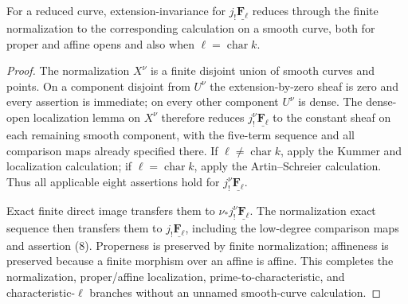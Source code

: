 \begin{lemma}
\label{lemma:weil-pbc-curve-normalization-constant}
\uses{}

For a reduced curve, extension-invariance for $j_!\underline{\mathbf F_\ell}$
reduces through the finite normalization to the corresponding calculation on
a smooth curve, both for proper and affine opens and also when
$\ell=\operatorname{char}k$.
\end{lemma}
\begin{proof}

The normalization $X^\nu$ is a finite disjoint union of smooth curves and
points.  On a component disjoint from $U^\nu$ the extension-by-zero sheaf is
zero and every assertion is immediate; on every other component $U^\nu$ is
dense.  The dense-open localization lemma on $X^\nu$ therefore reduces
$j^\nu_!\underline{\mathbf F_\ell}$ to the constant sheaf on each remaining
smooth component, with the five-term sequence and all comparison maps
already specified there.  If $\ell\ne\operatorname{char}k$, apply the Kummer and
localization calculation; if $\ell=\operatorname{char}k$, apply the
Artin--Schreier calculation.  Thus all applicable eight assertions hold for
$j^\nu_!\underline{\mathbf F_\ell}$.

Exact finite direct image transfers them to
$\nu_*j^\nu_!\underline{\mathbf F_\ell}$.  The normalization exact sequence
then transfers them to $j_!\underline{\mathbf F_\ell}$, including the
low-degree comparison maps and assertion (8).  Properness is preserved by
finite normalization; affineness is preserved because a finite morphism
over an affine is affine.  This completes the normalization, proper/affine
localization, prime-to-characteristic, and characteristic-$\ell$ branches
without an unnamed smooth-curve calculation.
\end{proof}

